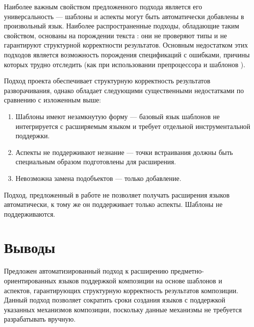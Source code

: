 Наиболее важным свойством предложенного подхода является его универсальность --- шаблоны и аспекты могут быть автоматически добавлены в произвольный язык. Наиболее распространенные подходы, обладающие таким свойством, основаны на порождении текста \cite{???}: они не проверяют типы и не гарантируют структурной корректности результатов. Основным недостатком этих подходов является возможность порождения спецификаций с ошибками, причины которых трудно отследить (как при использовании препроцессора  и шаблонов ).

Подход проекта  \cite{???} обеспечивает структурную корректность результатов разворачивания, однако обладает следующими существенными недостатками по сравнению с изложенным выше:
\begin{enumerate}
\item Шаблоны имеют незамкнутую форму --- базовый язык шаблонов не интегрируется с расширяемым языком и требует отдельной инструментальной поддержки.
\item Аспекты не поддерживают незнание --- точки встраивания должны быть специальным образом подготовлены для расширения.
\item Невозможна замена подобъектов --- только добавление. 
\end{enumerate}

Подход, предложенный в работе \cite{VanWyk} не позволяет получать расширения языков автоматически, к тому же он поддерживает только аспекты. Шаблоны не поддерживаются.

\chapter{Выводы}

Предложен автоматизированный подход к расширению предметно-ориентированных языков поддержкой композиции на основе шаблонов и аспектов, гарантирующих структурную корректность результатов композиции. Данный подход позволяет сократить сроки создания языков с поддержкой указанных механизмов композиции, поскольку данные механизмы не требуется разрабатывать вручную.
